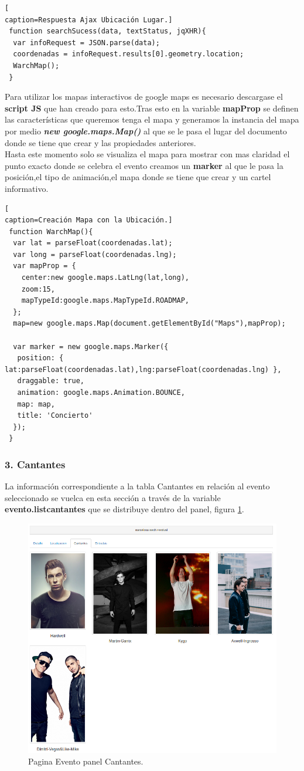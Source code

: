 \begin{lstlisting}[
caption=Respuesta Ajax Ubicación Lugar.]  
 function searchSucess(data, textStatus, jqXHR){
  var infoRequest = JSON.parse(data);
  coordenadas = infoRequest.results[0].geometry.location;
  WarchMap();  
 }
\end{lstlisting}
Para utilizar los mapas interactivos de google maps es necesario descargase el \textbf{script JS} que han creado para esto.Tras esto en la variable \textbf{mapProp} se definen las características que queremos tenga el mapa y generamos la instancia del mapa por medio \textit{\textbf{new google.maps.Map()}} al que se le pasa el lugar del documento donde se tiene que crear y las propiedades anteriores.
\\Hasta este momento solo se visualiza el mapa para mostrar con mas claridad el punto exacto donde se celebra el evento creamos un \textbf{marker} al que le pasa la posición,el tipo de animación,el mapa donde se tiene que crear y un cartel informativo.
\begin{lstlisting}[
caption=Creación Mapa con la Ubicación.]
 function WarchMap(){
  var lat = parseFloat(coordenadas.lat);
  var long = parseFloat(coordenadas.lng);
  var mapProp = {
    center:new google.maps.LatLng(lat,long),
    zoom:15,
    mapTypeId:google.maps.MapTypeId.ROADMAP,
  };
  map=new google.maps.Map(document.getElementById("Maps"),mapProp);
 
  var marker = new google.maps.Marker({
   position: { lat:parseFloat(coordenadas.lat),lng:parseFloat(coordenadas.lng) },
   draggable: true,
   animation: google.maps.Animation.BOUNCE,
   map: map,
   title: 'Concierto'
  });
 }
\end{lstlisting}
\subsubsection*{3. Cantantes}
La información correspondiente a la tabla Cantantes en relación al evento seleccionado se vuelca en esta sección a través de la variable \textbf{evento.listcantantes} que se distribuye dentro del panel, figura \ref{fig:Cantantes_Evento}.
\begin{figure}[!h]
\begin{center}
   \includegraphics[width=0.6\linewidth]{Figures/Cantantes_Evento}
	\decoRule
	\caption[Evento panel Cantantes]{Pagina Evento panel Cantantes.}
\label{fig:Cantantes_Evento}
\end{center}
\end{figure}
